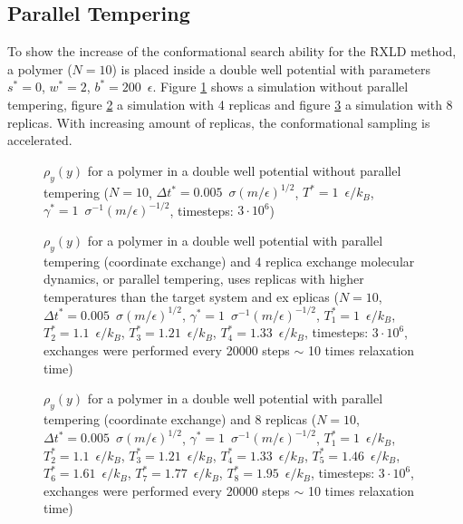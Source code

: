\documentclass[a4paper]{article}
\begin{document}
\subsection{Parallel Tempering}

To show the increase of the conformational search ability for the RXLD method, a polymer ($N = 10$) is placed inside a double well potential with parameters $s^* = 0$, $w^* = 2$, $b^* = 200 \enspace \epsilon$. Figure \ref{im:without_tempering} shows a simulation without parallel tempering, figure \ref{im:with_tempering_4} a simulation with 4 replicas and figure \ref{im:with_tempering_8} a simulation with 8 replicas. With increasing amount of replicas, the conformational sampling is accelerated. 

\begin{figure} [H]
\centering
\scalebox{.9}{}
\caption{$\rho_y(y)$ for a polymer in a double well potential without parallel tempering ($N = 10$, $\Delta t^* = 0.005 \enspace \sigma (m/\epsilon)^{1/2}$, $T^* = 1 \enspace \epsilon/k_B$, $\gamma^* = 1 \enspace \sigma^{-1} (m/\epsilon)^{-1/2}$, timesteps: $3 \cdot 10^6$)}
\label{im:without_tempering}
\end{figure}

\begin{figure} [H]
\centering
\scalebox{.9}{}
\caption{$\rho_y(y)$ for a polymer in a double well potential with parallel tempering (coordinate exchange) and 4 replica exchange molecular dynamics, or parallel tempering, uses replicas with higher temperatures than the target system and ex
eplicas ($N = 10$, $\Delta t^* = 0.005 \enspace \sigma (m/\epsilon)^{1/2}$, $\gamma^* = 1 \enspace \sigma^{-1} (m/\epsilon)^{-1/2}$, $T_1^* = 1 \enspace \epsilon/k_B$, $T_2^* = 1.1 \enspace \epsilon/k_B$, $T_3^* = 1.21 \enspace \epsilon/k_B$, $T_4^* = 1.33 \enspace \epsilon/k_B$, timesteps: $3 \cdot 10^6$, exchanges were performed every 20000 steps $\sim$ 10 times relaxation time)}
\label{im:with_tempering_4}
\end{figure}

\begin{figure} [H]
\centering
\scalebox{.9}{}
\caption{$\rho_y(y)$ for a polymer in a double well potential with parallel tempering (coordinate exchange) and 8 replicas ($N = 10$, $\Delta t^* = 0.005 \enspace \sigma (m/\epsilon)^{1/2}$, $\gamma^* = 1 \enspace \sigma^{-1} (m/\epsilon)^{-1/2}$, $T_1^* = 1 \enspace \epsilon/k_B$, $T_2^* = 1.1 \enspace \epsilon/k_B$, $T_3^* = 1.21 \enspace \epsilon/k_B$, $T_4^* = 1.33 \enspace \epsilon/k_B$, $T_5^* = 1.46 \enspace \epsilon/k_B$, $T_6^* = 1.61 \enspace \epsilon/k_B$, $T_7^* = 1.77 \enspace \epsilon/k_B$, $T_8^* = 1.95 \enspace \epsilon/k_B$, timesteps: $3 \cdot 10^6$, exchanges were performed every 20000 steps $\sim$ 10 times relaxation time)}
\label{im:with_tempering_8}
\end{figure}
\end{document}

